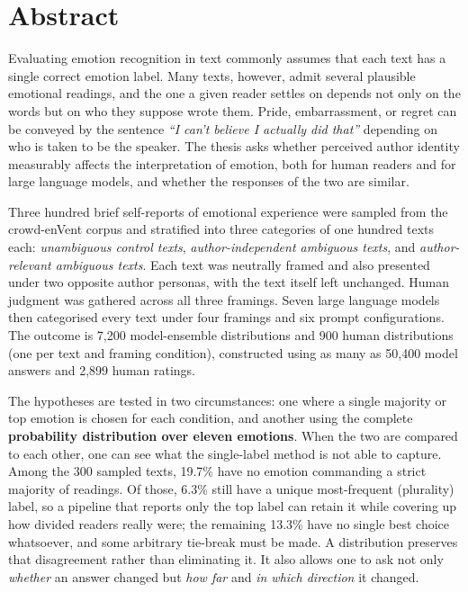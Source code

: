 \chapter*{Abstract}

Evaluating emotion recognition in text commonly assumes that each text has a single correct
emotion label. Many texts, however, admit several plausible emotional readings, and the one a
given reader settles on depends not only on the words but on who they suppose wrote them. Pride, embarrassment, or regret can be conveyed by the
sentence \emph{``I can't believe I actually did that''} depending on who is taken to be the
speaker. The thesis asks whether perceived author identity measurably affects the interpretation
of emotion, both for human readers and for large language models, and whether the responses of
the two are similar.

Three hundred brief self-reports of emotional experience were sampled from the crowd-enVent
corpus and stratified into three categories of one hundred texts each: \emph{unambiguous control
texts}, \emph{author-independent ambiguous texts}, and \emph{author-relevant ambiguous texts}.
Each text was neutrally framed and also presented under two opposite author personas, with the
text itself left unchanged. Human judgment was gathered across all three framings. Seven large
language models then categorised every text under four framings and six prompt
configurations. The outcome is 7{,}200 model-ensemble distributions and 900 human distributions
(one per text and framing condition), constructed using as many as 50{,}400 model answers and
2{,}899 human ratings.

The hypotheses are tested in two circumstances: one where a single majority or top emotion is
chosen for each condition, and another using the complete \textbf{probability distribution over
eleven emotions}. When the two are compared to each other, one can see what the single-label
method is not able to capture. Among the 300 sampled texts, 19.7\% have no emotion commanding
a strict majority of readings. Of those, 6.3\% still have a unique most-frequent (plurality) label, so a
pipeline that reports only the top label can retain it while covering up how divided readers
really were; the remaining 13.3\% have no single best choice whatsoever, and some arbitrary
tie-break must be made. A distribution preserves that disagreement rather than eliminating it. It
also allows one to ask not only \emph{whether} an answer changed but \emph{how far} and
\emph{in which direction} it changed.

